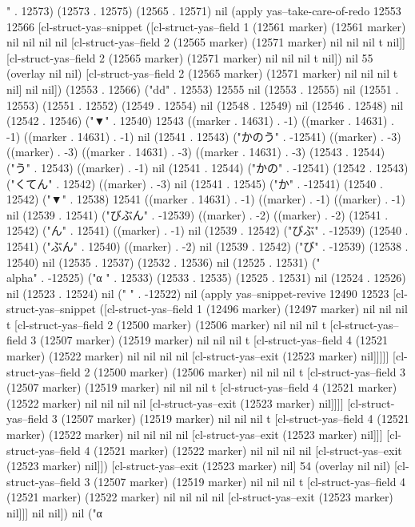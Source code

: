 " . 12573) (12573 . 12575) (12565 . 12571) nil (apply yas--take-care-of-redo 12553 12566 [cl-struct-yas--snippet ([cl-struct-yas--field 1 (12561 marker) (12561 marker) nil nil nil nil [cl-struct-yas--field 2 (12565 marker) (12571 marker) nil nil nil t nil]] [cl-struct-yas--field 2 (12565 marker) (12571 marker) nil nil nil t nil]) nil 55 (overlay nil nil) [cl-struct-yas--field 2 (12565 marker) (12571 marker) nil nil nil t nil] nil nil]) (12553 . 12566) ("dd" . 12553) 12555 nil (12553 . 12555) nil (12551 . 12553) (12551 . 12552) (12549 . 12554) nil (12548 . 12549) nil (12546 . 12548) nil (12542 . 12546) ("▼" . 12540) 12543 ((marker . 14631) . -1) ((marker . 14631) . -1) ((marker . 14631) . -1) nil (12541 . 12543) ("かのう" . -12541) ((marker) . -3) ((marker) . -3) ((marker . 14631) . -3) ((marker . 14631) . -3) (12543 . 12544) ("う" . 12543) ((marker) . -1) nil (12541 . 12544) ("かの" . -12541) (12542 . 12543) ("くてん" . 12542) ((marker) . -3) nil (12541 . 12545) ("か" . -12541) (12540 . 12542) ("▼" . 12538) 12541 ((marker . 14631) . -1) ((marker) . -1) ((marker) . -1) nil (12539 . 12541) ("びぶん" . -12539) ((marker) . -2) ((marker) . -2) (12541 . 12542) ("ん" . 12541) ((marker) . -1) nil (12539 . 12542) ("びぶ" . -12539) (12540 . 12541) ("ぶん" . 12540) ((marker) . -2) nil (12539 . 12542) ("び" . -12539) (12538 . 12540) nil (12535 . 12537) (12532 . 12536) nil (12525 . 12531) ("\\alpha" . -12525) ("α
" . 12533) (12533 . 12535) (12525 . 12531) nil (12524 . 12526) nil (12523 . 12524) nil (" " . -12522) nil (apply yas--snippet-revive 12490 12523 [cl-struct-yas--snippet ([cl-struct-yas--field 1 (12496 marker) (12497 marker) nil nil nil t [cl-struct-yas--field 2 (12500 marker) (12506 marker) nil nil nil t [cl-struct-yas--field 3 (12507 marker) (12519 marker) nil nil nil t [cl-struct-yas--field 4 (12521 marker) (12522 marker) nil nil nil nil [cl-struct-yas--exit (12523 marker) nil]]]]] [cl-struct-yas--field 2 (12500 marker) (12506 marker) nil nil nil t [cl-struct-yas--field 3 (12507 marker) (12519 marker) nil nil nil t [cl-struct-yas--field 4 (12521 marker) (12522 marker) nil nil nil nil [cl-struct-yas--exit (12523 marker) nil]]]] [cl-struct-yas--field 3 (12507 marker) (12519 marker) nil nil nil t [cl-struct-yas--field 4 (12521 marker) (12522 marker) nil nil nil nil [cl-struct-yas--exit (12523 marker) nil]]] [cl-struct-yas--field 4 (12521 marker) (12522 marker) nil nil nil nil [cl-struct-yas--exit (12523 marker) nil]]) [cl-struct-yas--exit (12523 marker) nil] 54 (overlay nil nil) [cl-struct-yas--field 3 (12507 marker) (12519 marker) nil nil nil t [cl-struct-yas--field 4 (12521 marker) (12522 marker) nil nil nil nil [cl-struct-yas--exit (12523 marker) nil]]] nil nil]) nil ("α
